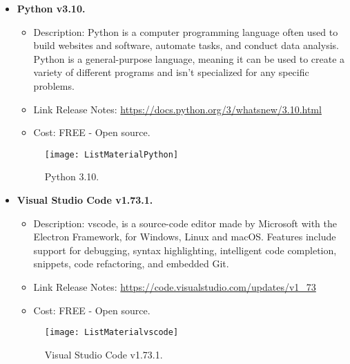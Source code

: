 \begin{itemize}
	\item \textbf{Python v3.10.} \\
	\begin{itemize}
	\item Description: Python is a computer programming language often used to build websites and software, automate tasks, and conduct data analysis. Python is a general-purpose language, meaning it can be used to create a variety of different programs and isn't specialized for any specific problems.
	\item Link Release Notes: \url{https://docs.python.org/3/whatsnew/3.10.html}
	\item Cost: FREE - Open source.
\end{itemize}
\begin{figure}  [H]
	\begin{center}
		\texttt{[image: ListMaterialPython]}
		\caption{Python 3.10.} 
		\label{fig:Python 3.10.}
	\end{center}
\end{figure}			
		
	\item \textbf{Visual Studio Code v1.73.1.} \\
	\begin{itemize}
	\item Description: \ac{vscode}, is a source-code editor made by Microsoft with the Electron Framework, for Windows, Linux and macOS. Features include support for debugging, syntax highlighting, intelligent code completion, snippets, code refactoring, and embedded Git.
	\item Link Release Notes: \url{https://code.visualstudio.com/updates/v1_73}
	\item Cost: FREE - Open source.
\end{itemize}
\begin{figure}  [H]
	\begin{center}
		\texttt{[image: ListMaterialvscode]}
		\caption{Visual Studio Code v1.73.1.} 
		\label{fig:Visual Studio Code v1.73.1.}
	\end{center}
\end{figure}			
		

\end{itemize}
